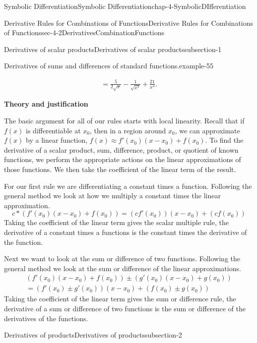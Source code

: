 \documentclass[oneside,10pt,]{book}
\newcommand{\terminology}[1]{\textbf{#1}}
\numberwithin{equation}{section}
\begin{document}
\begin{chapterptx}{Symbolic Differentiation}{}{Symbolic Differentiation}{}{}{chap-4-SymbolicDIfferentiation}
\begin{sectionptx}{Derivative Rules for Combinations of Functions}{}{Derivative Rules for Combinations of Functions}{}{}{sec-4-2DerivativesCombinationFunctions}
\begin{subsectionptx}{Derivatives of scalar products}{}{Derivatives of scalar products}{}{}{subsection-1}
\begin{example}{Derivatives of sums and differences of standard functions.}{example-55}
\begin{enumerate}[label=(\alph*)]
\begin{gather*}
=\frac{5}{2\sqrt{x}}-\frac{1}{\sqrt{x^3}}+\frac{21}{x^4}. 
\end{gather*}
%
\end{enumerate}
\end{example}
\hypertarget{p-1534}{}%
\terminology{Theory and justification}%
\par
\hypertarget{p-1535}{}%
The basic argument for all of our rules starts with local linearity.  Recall that if \(f(x)\) is differentiable at \(x_0\), then in a region around \(x_0\), we can approximate \(f(x)\) by a linear function, \(f(x)\approx f'(x_0 )(x-x_0 )+f(x_0)\).  To find the derivative of a scalar product, sum, difference, product, or quotient of known functions, we perform the appropriate actions on the linear approximations of those functions. We then take the coefficient of the linear term of the result.%
\par
\hypertarget{p-1536}{}%
For our first rule we are differentiating a constant times a function.  Following the general method we look at how we multiply a constant times the linear approximation.%
%
\begin{equation*}
c*(f' (x_0 )(x-x_0 )+f(x_0 ))=(c f' (x_0 ))(x-x_0 )+(c f(x_0 ))
\end{equation*}
\hypertarget{p-1537}{}%
Taking the coefficient of the linear term gives the scalar multiple rule, the derivative of a constant times a functions is the constant times the derivative of the function.%
\par
\hypertarget{p-1538}{}%
Next we want to look at the sum or difference of two functions.  Following the general method we look at the sum or difference of the linear approximations.%
%
\begin{gather*}
(f' (x_0 )(x-x_0 )+f(x_0 ))\pm(g' (x_0 )(x-x_0 )+g(x_0 ))\\
=( f' (x_0 )\pm g' (x_0 ))(x-x_0 )+(f(x_0 )±g(x_0 )) 
\end{gather*}
\hypertarget{p-1539}{}%
Taking the coefficient of the linear term gives the sum or difference rule, the derivative of a sum or difference of two functions is the sum or difference of the derivatives of the functions.%
\end{subsectionptx}
%
%
\typeout{************************************************}
\typeout{************************************************}
%
\begin{subsectionptx}{Derivatives of products}{}{Derivatives of products}{}{}{subsection-2}
\begin{introduction}{}%

\end{introduction}
\end{subsectionptx}
\end{sectionptx}
\end{chapterptx}
\end{document}
